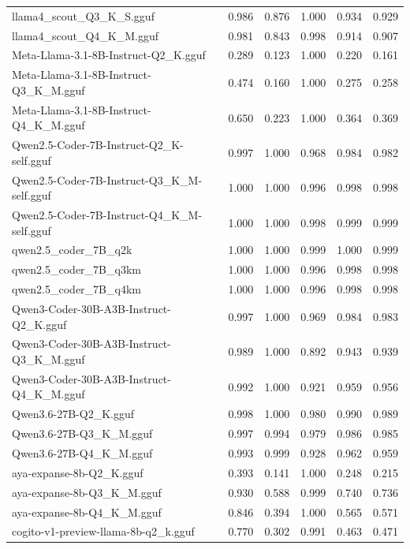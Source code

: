 \begin{table}[htbp]
{\begin{tabular}{lrrrrr}
    llama4\_scout\_Q3\_K\_S.gguf & 0.986 & 0.876 & 1.000 & 0.934 & 0.929 \\
    llama4\_scout\_Q4\_K\_M.gguf & 0.981 & 0.843 & 0.998 & 0.914 & 0.907 \\
    Meta-Llama-3.1-8B-Instruct-Q2\_K.gguf & 0.289 & 0.123 & 1.000 & 0.220 & 0.161 \\
    Meta-Llama-3.1-8B-Instruct-Q3\_K\_M.gguf & 0.474 & 0.160 & 1.000 & 0.275 & 0.258 \\
    Meta-Llama-3.1-8B-Instruct-Q4\_K\_M.gguf & 0.650 & 0.223 & 1.000 & 0.364 & 0.369 \\
    Qwen2.5-Coder-7B-Instruct-Q2\_K-self.gguf & 0.997 & 1.000 & 0.968 & 0.984 & 0.982 \\
    Qwen2.5-Coder-7B-Instruct-Q3\_K\_M-self.gguf & 1.000 & 1.000 & 0.996 & 0.998 & \cellcolor{green!20}0.998 \\
    Qwen2.5-Coder-7B-Instruct-Q4\_K\_M-self.gguf & 1.000 & 1.000 & 0.998 & 0.999 & \cellcolor{green!40}0.999 \\
    qwen2.5\_coder\_7B\_q2k & 1.000 & 1.000 & 0.999 & 1.000 & \cellcolor{green!50}0.999 \\
    qwen2.5\_coder\_7B\_q3km & 1.000 & 1.000 & 0.996 & 0.998 & \cellcolor{green!10}0.998 \\
    qwen2.5\_coder\_7B\_q4km & 1.000 & 1.000 & 0.996 & 0.998 & 0.998 \\
    Qwen3-Coder-30B-A3B-Instruct-Q2\_K.gguf & 0.997 & 1.000 & 0.969 & 0.984 & 0.983 \\
    Qwen3-Coder-30B-A3B-Instruct-Q3\_K\_M.gguf & 0.989 & 1.000 & 0.892 & 0.943 & 0.939 \\
    Qwen3-Coder-30B-A3B-Instruct-Q4\_K\_M.gguf & 0.992 & 1.000 & 0.921 & 0.959 & 0.956 \\
    Qwen3.6-27B-Q2\_K.gguf & 0.998 & 1.000 & 0.980 & 0.990 & 0.989 \\
    Qwen3.6-27B-Q3\_K\_M.gguf & 0.997 & 0.994 & 0.979 & 0.986 & 0.985 \\
    Qwen3.6-27B-Q4\_K\_M.gguf & 0.993 & 0.999 & 0.928 & 0.962 & 0.959 \\
    aya-expanse-8b-Q2\_K.gguf & 0.393 & 0.141 & 1.000 & 0.248 & 0.215 \\
    aya-expanse-8b-Q3\_K\_M.gguf & 0.930 & 0.588 & 0.999 & 0.740 & 0.736 \\
    aya-expanse-8b-Q4\_K\_M.gguf & 0.846 & 0.394 & 1.000 & 0.565 & 0.571 \\
    cogito-v1-preview-llama-8b-q2\_k.gguf & 0.770 & 0.302 & 0.991 & 0.463 & 0.471 \\

\end{tabular}}
\end{table}
